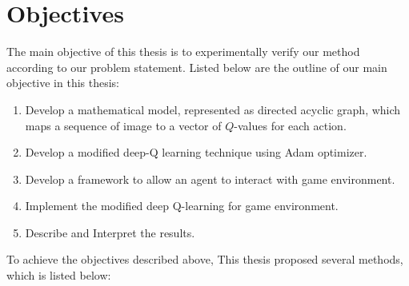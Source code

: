 	\section{Objectives}
	    The main objective of this thesis is to experimentally verify our method according to our problem statement. Listed below are the outline of our main objective in this thesis:
	    \begin{enumerate}
	    \item Develop a mathematical model, represented as directed acyclic graph, which maps a sequence of image to a vector of $Q$-values for each action. 
	    \item Develop a modified deep-Q learning technique using Adam optimizer.
        \item Develop a framework to allow an agent to interact with game environment.
        \item Implement the modified deep Q-learning for game environment.
        \item Describe and Interpret the results.
         \end{enumerate}
        To achieve the objectives described above, This thesis proposed several methods, which is listed below:
